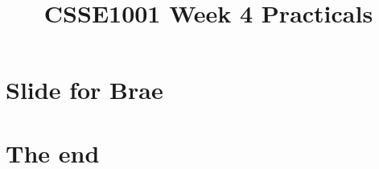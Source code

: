 \documentclass[week2]{csse1001}
\title{CSSE1001 Week 4 Practicals}
\begin{document}
\begin{frame} 
\maketitle
\end{frame}

\section{Slide for Brae}

\section{The end}
\end{document}
